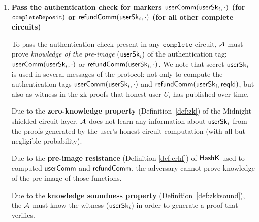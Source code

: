 \begin{enumerate}
    \item \textbf{Pass the authentication check for markers  $\mathsf{userComm}(\mathsf{userSk}_i, \cdot)$  (for $\texttt{\small completeDeposit})$  or  $\mathsf{refundComm}(\mathsf{userSk}_i,\cdot)$ (for all other complete circuits)}

     To pass the authentication check present in any $\mathtt{complete}$ circuit, $\mathcal{A}$ must prove  \emph{knowledge of the pre-image } ($\mathsf{userSk}_i)$ of  the authentication tag:
     $\mathsf{userComm}(\mathsf{userSk}_i, \cdot)$ or  $\mathsf{refundComm}(\mathsf{userSk}_i, \cdot)$.
     We note that  secret  $\mathsf{userSk}_i$ is used  in several messages of the protocol: not only to compute the authentication tags  $\mathsf{userComm}(\mathsf{userSk}_i, \cdot)$  and
     $\mathsf{refundComm}(\mathsf{userSk}_i,\mathsf{reqId})$, but also as witness in the zk proofs that honest user $U_i$ has  published over time.


    Due to the \textbf{zero-knowledge property} (Definition~\ref{def:zk}) of the Midnight shielded-circuit layer,  $\mathcal{A}$ does not learn any information about $\mathsf{userSk}_i$ from the proofs generated by the user's honest circuit computation (with all but negligible probability).

      \vspace{3pt}
    Due to the \textbf{pre-image resistance} (Definition \ref{def:crhf}) of $\mathsf{HashK}$ used to computed  $\mathsf{userComm}$ and $\mathsf{refundComm}$,  the adversary cannot prove knowledge of the pre-image of those functions.

    \vspace{3pt}
    Due to the \textbf{knowledge soundness property}  (Definition~\ref{def:zkksound}), the $\mathcal{A}$ must know the witness ($\mathsf{userSk}_i$) in order to generate a proof that verifies.

\end{enumerate}
